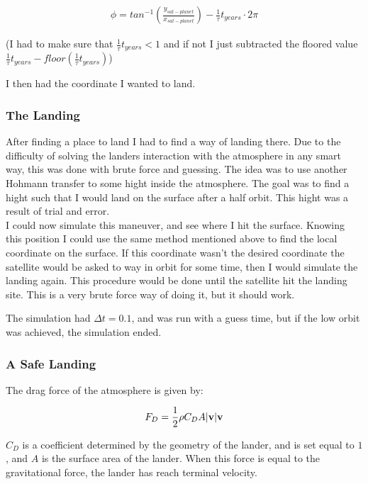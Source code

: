 \documentclass[a4paper, 10pt]{article}
\begin{document}
\begin{align}
\phi = tan^{-1}\left(\frac{y_{sat-planet}}{x_{sat-planet}} \right) - \frac{1}{\tau}t_{years}\cdot 2\pi
\end{align}

(I had to make sure that $\frac{1}{\tau}t_{years} < 1$ and if not I just subtracted the floored value $\frac{1}{\tau}t_{years} - floor(\frac{1}{\tau}t_{years})$)

I then had the coordinate I wanted to land.

\subsubsection{The Landing}
After finding a place to land I had to find a way of landing there. Due to the difficulty of solving the landers interaction with the atmosphere in any smart way, this was done with brute force and guessing. The idea was to use another Hohmann transfer to some hight inside the atmosphere. The goal was to find a hight such that I would land on the surface after a half orbit. This hight was a result of trial and error. \\

I could now simulate this maneuver, and see where I hit the surface. Knowing this position I could use the same method mentioned above to find the local coordinate on the surface. If this coordinate wasn't the desired coordinate the satellite would be asked to way in orbit for some time, then I would simulate the landing again. This procedure would be done until the satellite hit the landing site. This is a very brute force way of doing it, but it should work. 


The simulation had $\Delta t = 0.1$, and was run with a guess time, but if the low orbit was achieved, the simulation ended.

\subsubsection{A Safe Landing}

The drag force of the atmosphere is given by:

\begin{align}
F_D = \frac{1}{2}\rho C_D A |\bold{v}| \bold{v}
\end{align}

$C_D$ is a coefficient determined by the geometry of the lander, and is set equal to $1$, and $A$ is the surface area of the lander. When this force is equal to the gravitational force, the lander has reach terminal velocity.
\end{document}
